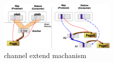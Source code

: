\begin{figure}[!h!t]  
    \centering
    \includegraphics[width=0.5\textwidth]{eps/spmckern_extend.eps}
    \caption{channel extend machanism}
    \label{fig:spmckern:extend}
\end{figure}














